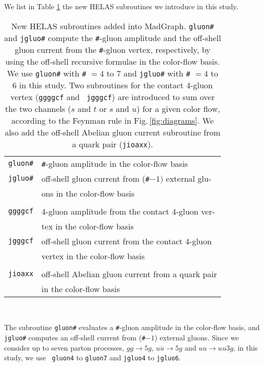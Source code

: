  We list in Table \ref{tb:subroutines} the new HELAS subroutines we
 introduce in this study.
\begin{table}
\begin{tabular}{r|l}
\hline\hline
{\tt gluon\#}&{\tt \#}-gluon amplitude in the color-flow basis\\
{\tt jgluo\#}&off-shell gluon current from ({\tt \#}$-1)$ external glu-\\
& ons in the color-flow basis\\\\
{\tt ggggcf}&4-gluon amplitude from the contact 4-gluon ver-\\
&tex in the color-flow basis\\
{\tt jgggcf}&off-shell gluon current from the contact 4-gluon\\
& vertex in the color-flow basis\\\\
 {\tt jioaxx}&off-shell Abelian gluon current from a quark pair\\
 & in the color-flow basis\\
\hline\hline
\end{tabular}\\
\hspace{2em}
\caption{New HELAS subroutines added into
 MadGraph. {\tt gluon\#} and {\tt jgluo\#} compute the {\tt \#}-gluon
 amplitude and the off-shell gluon
 current from the \mbox{{\tt \#}-gluon} vertex, respectively, by using the off-shell
 recursive formulae in the color-flow basis. We use {\tt gluon\#} with
 {\tt \#} $=4$
 to $7$ and {\tt jgluo\#} with {\tt \#} $=4$ to $6$ in this study. Two subroutines for the contact 4-gluon vertex ({\tt ggggcf} and {\tt
 jgggcf}) are introduced to sum over the two channels ($s$ and $t$ or
 $s$ and $u$) for a given color flow, according to the Feynman rule in
 Fig.\,\ref{fig:diagrams}.  We also add the off-shell Abelian
 gluon current subroutine from a quark pair ({\tt jioaxx}).}
\label{tb:subroutines}
\end{table}
The subroutine {\tt gluon\#} evaluates a {\tt \#}-gluon
  amplitude in the color-flow basis, and {\tt jgluo\#} computes an off-shell current from
  ({\tt \#}$-1$) external gluons. Since we consider up to seven parton processes, $gg\rightarrow 5g$, $u\overline{u}\rightarrow
  5g$ and $uu\rightarrow uu3g$, in this study, we use {\tt
  gluon4} to {\tt gluon7} and {\tt jgluo4} to {\tt jgluo6}.

